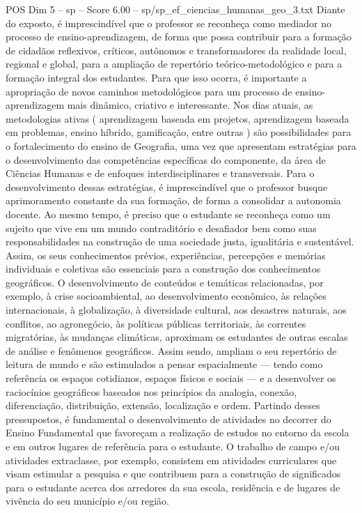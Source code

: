 \begin{textsample}{POS Dim 5 – sp – Score 6.00 – sp/sp\_ef\_ciencias\_humanas\_geo\_3.txt}  \label{ex:f5_pos_075}
Diante do exposto, é imprescindível que o professor se reconheça como mediador no processo de ensino-aprendizagem, de forma que possa contribuir para a formação de cidadãos reflexivos, críticos, autônomos e transformadores da realidade local, regional e global, para a ampliação de repertório teórico-metodológico e para a formação integral dos estudantes.
Para que isso ocorra, é importante a apropriação de novos caminhos metodológicos para um processo de ensino-aprendizagem mais dinâmico, criativo e interessante.
Nos dias atuais, as metodologias ativas ( aprendizagem baseada em projetos, aprendizagem baseada em problemas, ensino híbrido, gamificação, entre outras ) são possibilidades para o fortalecimento do ensino de Geografia, uma vez que apresentam estratégias para o desenvolvimento das competências específicas do componente, da área de Ciências Humanas e de enfoques interdisciplinares e transversais.
Para o desenvolvimento dessas estratégias, é imprescindível que o professor busque aprimoramento constante da sua formação, de forma a consolidar a autonomia docente.
Ao mesmo tempo, é preciso que o estudante se reconheça como um sujeito que vive em um mundo contraditório e desafiador bem como suas responsabilidades na construção de uma sociedade justa, igualitária e sustentável.
Assim, os seus conhecimentos prévios, experiências, percepções e memórias individuais e coletivas são essenciais para a construção dos conhecimentos geográficos.
O desenvolvimento de conteúdos e temáticas relacionadas, por exemplo, à crise socioambiental, ao desenvolvimento econômico, às relações internacionais, à globalização, à diversidade cultural, aos desastres naturais, aos conflitos, ao agronegócio, às políticas públicas territoriais, às correntes migratórias, às mudanças climáticas, aproximam os estudantes de outras escalas de análise e fenômenos geográficos.
Assim sendo, ampliam o seu repertório de leitura de mundo e são estimulados a pensar espacialmente — tendo como referência os espaços cotidianos, espaços físicos e sociais — e a desenvolver os raciocínios geográficos baseados nos princípios da analogia, conexão, diferenciação, distribuição, extensão, localização e ordem.
Partindo desses pressupostos, é fundamental o desenvolvimento de atividades no decorrer do Ensino Fundamental que favoreçam a realização de estudos no entorno da escola e em outros lugares de referência para o estudante.
O trabalho de campo e/ou atividades extraclasse, por exemplo, consistem em atividades curriculares que visam estimular a pesquisa e que contribuem para a construção de significados para o estudante acerca dos arredores da sua escola, residência e de lugares de vivência do seu município e/ou região.

\end{textsample}
